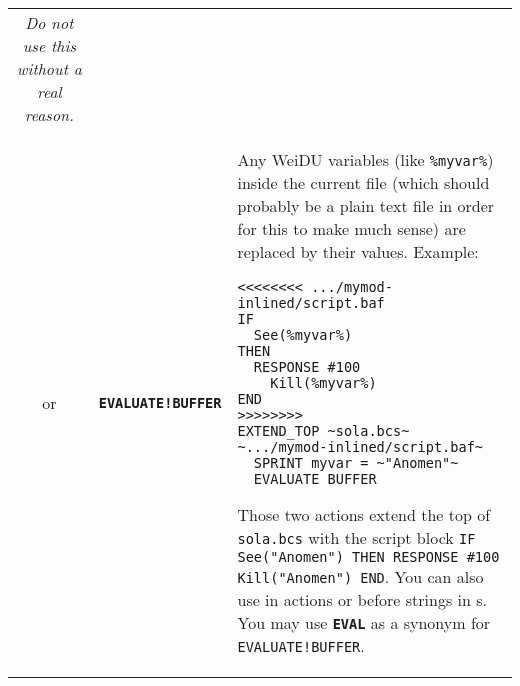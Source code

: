 \documentclass{article}
\def\ttref#1{\ahrefloc{#1}{\tt #1}}
\def\DEFINE#1{{\tt \bf #1}\label{#1}\index{#1}}
\def\t#1{{\tt #1}}
\begin{document}
\begin{tabular}{cp{10in}|p{10in}}
	\emph{Do not use this without a real reason.}
\\
or & \DEFINE{EVALUATE!BUFFER} &
  Any WeiDU variables (like \t{\%myvar\%}) inside the current file (which
  should probably be a plain text file in order for this to make much sense)
  are replaced by their values. Example:
\begin{verbatim}
<<<<<<<< .../mymod-inlined/script.baf
IF
  See(%myvar%)
THEN
  RESPONSE #100
    Kill(%myvar%)
END
>>>>>>>>
EXTEND_TOP ~sola.bcs~ ~.../mymod-inlined/script.baf~
  SPRINT myvar = ~"Anomen"~
  EVALUATE_BUFFER
\end{verbatim}
  Those two actions extend the top of \t{sola.bcs} with the script
  block \t{IF See("Anomen") THEN RESPONSE \#100 Kill("Anomen") END}.
  You can also use \ttref{EVALUATE!BUFFER} in \ttref{COMPILE} actions
  or before strings in \ttref{value}s. You may use \DEFINE{EVAL} as
  a synonym for \t{EVALUATE!BUFFER}.
  \\


\end{tabular}
\end{document}
